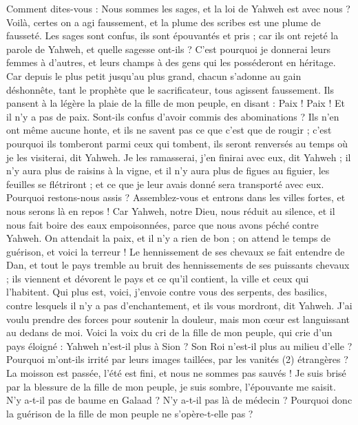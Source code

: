 \begin{multicols}{2}
Comment dites-vous : Nous sommes les sages, et la loi de Yahweh est avec nous ? Voilà, certes on a agi faussement, et la plume des scribes est une plume de fausseté.
Les sages sont confus, ils sont épouvantés et pris ; car ils ont rejeté la parole de Yahweh, et quelle sagesse ont-ils ?
C'est pourquoi je donnerai leurs femmes à d'autres, et leurs champs à des gens qui les posséderont en héritage. Car depuis le plus petit jusqu'au plus grand, chacun s'adonne au gain déshonnête, tant le prophète que le sacrificateur, tous agissent faussement.
Ils pansent à la légère la plaie de la fille de mon peuple, en disant : Paix ! Paix ! Et il n'y a pas de paix.
Sont-ils confus d'avoir commis des abominations ? Ils n'en ont même aucune honte, et ils ne savent pas ce que c'est que de rougir ; c'est pourquoi ils tomberont parmi ceux qui tombent, ils seront renversés au temps où je les visiterai, dit Yahweh.
Je les ramasserai, j'en finirai avec eux, dit Yahweh ; il n'y aura plus de raisins à la vigne, et il n'y aura plus de figues au figuier, les feuilles se flétriront ; et ce que je leur avais donné sera transporté avec eux.
Pourquoi restons-nous assis ? Assemblez-vous et entrons dans les villes fortes, et nous serons là en repos ! Car Yahweh, notre Dieu, nous réduit au silence, et il nous fait boire des eaux empoisonnées, parce que nous avons péché contre Yahweh.
On attendait la paix, et il n'y a rien de bon ; on attend le temps de guérison, et voici la terreur !
Le hennissement de ses chevaux se fait entendre de Dan, et tout le pays tremble au bruit des hennissements de ses puissants chevaux ; ils viennent et dévorent le pays et ce qu'il contient, la ville et ceux qui l'habitent.
Qui plus est, voici, j'envoie contre vous des serpents, des basilics, contre lesquels il n'y a pas d'enchantement, et ils vous mordront, dit Yahweh.
J'ai voulu prendre des forces pour soutenir la douleur, mais mon cœur est languissant au dedans de moi.
Voici la voix du cri de la fille de mon peuple, qui crie d'un pays éloigné : Yahweh n'est-il plus à Sion ? Son Roi n'est-il plus au milieu d'elle ? Pourquoi m'ont-ils irrité par leurs images taillées, par les vanités (2) étrangères ?
La moisson est passée, l'été est fini, et nous ne sommes pas sauvés !
Je suis brisé par la blessure de la fille de mon peuple, je suis sombre, l'épouvante me saisit.
N'y a-t-il pas de baume en Galaad ? N'y a-t-il pas là de médecin ? Pourquoi donc la guérison de la fille de mon peuple ne s'opère-t-elle pas ?

\end{multicols}
